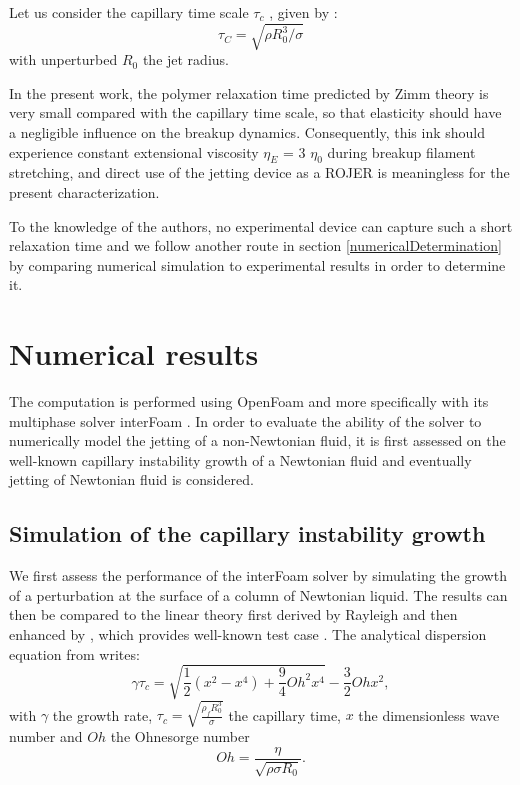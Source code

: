 \documentclass[twocolumn,10pt]{asme2ej}
\begin{document}
Let us consider the capillary time scale $\tau_c$ , given by :
\begin{equation}
    \tau_C= \sqrt{\rho R_0^3 / \sigma}
\end{equation}
with unperturbed $R_0$ the jet radius. 

In the present work, the polymer relaxation time predicted by Zimm theory is very small compared with the capillary time scale, so that elasticity should have a negligible influence on the breakup dynamics. Consequently, this ink should experience constant extensional viscosity $\eta_E$ = 3 $\eta_0$ during breakup filament stretching, and direct use of the jetting device as a ROJER \cite{keshavarz2015studying} is meaningless for the present characterization. 

To the knowledge of the authors, no experimental device can capture such a short relaxation time and we follow another route in section \ref{numericalDetermination} by comparing numerical simulation to experimental results in order to determine it.

\section{Numerical results}
The computation is performed using OpenFoam and more specifically with its multiphase solver interFoam \cite{deshpande2012evaluating}. In order to evaluate the ability of the solver to numerically model the jetting of a non-Newtonian fluid, it is first assessed on the well-known capillary instability growth of a Newtonian fluid and eventually jetting of Newtonian fluid is considered.

\subsection{Simulation of the capillary instability growth}
We first assess the performance of the interFoam solver by simulating the growth of a perturbation at the surface of a column of Newtonian liquid. The results can then be compared to the linear theory first derived by Rayleigh \cite{rayleigh1892xvi} and then enhanced by \cite{chandrasekhar2013hydrodynamic}, which provides well-known test case \cite{delteil2011numerical,cervone2010simulation}.
The analytical dispersion equation from \cite{chandrasekhar2013hydrodynamic} writes:
\begin{equation}
    \gamma \tau_c = \sqrt{\frac{1}{2}(x^{2}-x^{4}) + \frac{9}{4}Oh^{2}x^{4}}-\frac{3}{2}Oh x^{2},
    \label{eq:growthRateAnalytical}
\end{equation}
with $\gamma$ the growth rate, $\displaystyle \tau_c = \sqrt{\frac{\rho_f R_0^3}{\sigma}}$ the capillary time, $x$ the dimensionless wave number and $Oh$ the Ohnesorge number
\begin{equation}
    Oh=\frac{\eta}{\sqrt{\rho \sigma R_0}}.
    \label{eq:Oh2}
\end{equation} 
\end{document}

